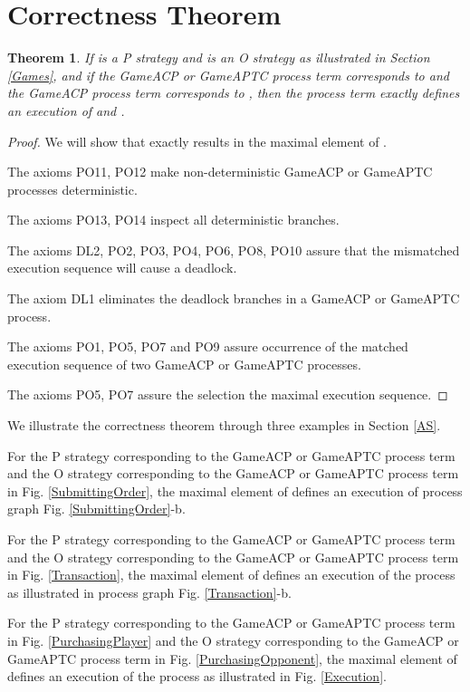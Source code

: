 \documentclass{fac}
\newtheorem{theorem}{Theorem}[section]
\begin{document}
\section{Correctness Theorem}

\begin{theorem}
If  is a P strategy and  is an O strategy as illustrated in Section \ref{Games}, and if the GameACP or GameAPTC process term  corresponds to  and the GameACP process term  corresponds to , then the process term  exactly defines an execution of  and .
\end{theorem}

\begin{proof}
We will show that  exactly results in the maximal element of .

The axioms PO11, PO12 make non-deterministic GameACP or GameAPTC processes deterministic.

The axioms PO13, PO14 inspect all deterministic branches.

The axioms DL2, PO2, PO3, PO4, PO6, PO8, PO10 assure that the mismatched execution sequence will cause a deadlock.

The axiom DL1 eliminates the deadlock branches in a GameACP or GameAPTC process.

The axioms PO1, PO5, PO7 and PO9 assure occurrence of the matched execution sequence of two GameACP or GameAPTC processes.

The axioms PO5, PO7 assure the selection the maximal execution sequence.
\end{proof}

We illustrate the correctness theorem through three examples in Section \ref{AS}.

For the P strategy corresponding to the GameACP or GameAPTC process term  and the O strategy corresponding to the GameACP or GameAPTC process term  in Fig. \ref{SubmittingOrder}, the maximal element  of  defines an execution of  process graph Fig. \ref{SubmittingOrder}-b.



For the P strategy  corresponding to the GameACP or GameAPTC process term  and the O strategy corresponding to the GameACP or GameAPTC process term  in Fig. \ref{Transaction}, the maximal element  of  defines an execution of the process as illustrated in process graph Fig. \ref{Transaction}-b.



For the P strategy  corresponding to the GameACP or GameAPTC process term  in Fig. \ref{PurchasingPlayer} and the O strategy corresponding to the GameACP or GameAPTC process term  in Fig. \ref{PurchasingOpponent}, the maximal element  of  defines an execution of the process as illustrated in Fig. \ref{Execution}.
\end{document}
